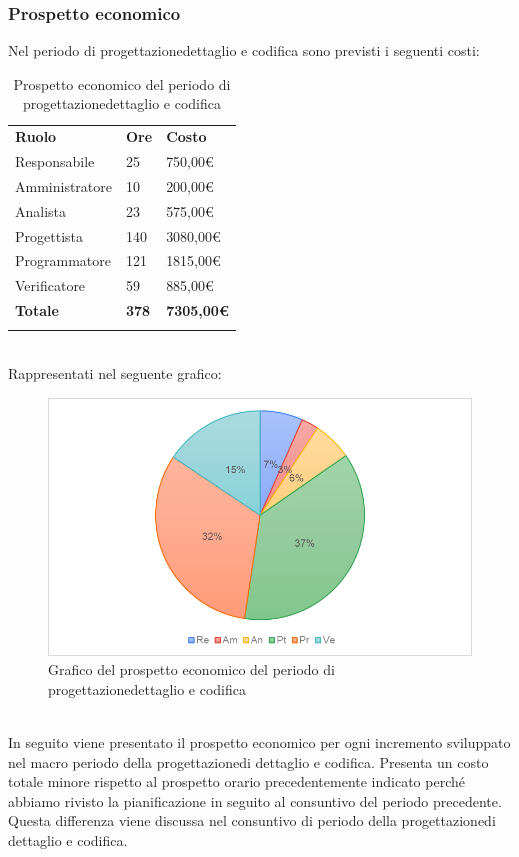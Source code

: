 \subsubsection{Prospetto economico}
Nel periodo di progettazione\glosp dettaglio e codifica sono previsti i seguenti costi:
\begin{longtable} {
		>{}p{32mm}
		>{}p{20mm}
		>{}p{20mm}
	}
	\rowcolor{gray!50}
	
	\textbf{Ruolo} & \textbf{Ore} & \textbf{Costo} \TBstrut \\
	Responsabile & 25 & 750,00\euro{} \TBstrut \\
	Amministratore & 10 & 200,00\euro{} \TBstrut \\
	Analista & 23 & 575,00\euro{} \TBstrut \\
	Progettista & 140 & 3080,00\euro{}\TBstrut \\
	Programmatore & 121 & 1815,00\euro{} \TBstrut \\
	Verificatore & 59 & 885,00\euro{} \TBstrut \\
	\textbf{Totale} & \textbf{378}& \textbf{7305,00\euro{}} \TBstrut \\	
	\rowcolor{white}
	\caption{Prospetto economico del periodo di progettazione\glosp dettaglio e codifica}
\end{longtable} \mbox{} \\
Rappresentati nel seguente grafico: \mbox{}
\begin{figure} [h!]
	\includegraphics[width=\linewidth]{./img/Grafici/6.png}
	\caption{Grafico del prospetto economico del periodo di progettazione\glosp dettaglio e codifica}
\end{figure}
\mbox{} \\
In seguito viene presentato il prospetto economico per ogni incremento sviluppato nel macro periodo della progettazione\glosp di dettaglio e codifica. Presenta un costo totale minore rispetto al prospetto orario precedentemente indicato perché abbiamo rivisto la pianificazione in seguito al consuntivo del periodo precedente. Questa differenza viene discussa nel consuntivo di periodo della progettazione\glosp di dettaglio e codifica.
